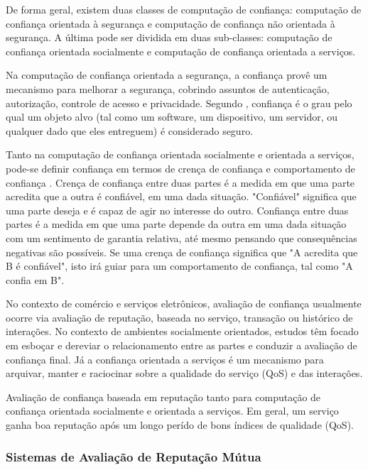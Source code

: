 De forma geral, existem duas classes de computação de confiança: computação de confiança orientada à segurança e computação de confiança não orientada à segurança. A última pode ser dividida em duas sub-classes: computação de confiança orientada socialmente e computação de confiança orientada a serviços.

Na computação de confiança orientada a segurança, a confiança provê um mecanismo para melhorar a segurança, cobrindo assuntos de autenticação, autorização, controle de acesso e privacidade. Segundo \cite{wang2008reputation}, confiança é o grau pelo qual um objeto alvo (tal como um software, um dispositivo, um servidor, ou qualquer dado que eles entreguem) é considerado seguro.

Tanto na computação de confiança orientada socialmente e orientada a serviços, pode-se definir confiança em termos de crença de confiança e comportamento de confiança \cite{wang2008reputation}. Crença de confiança entre duas partes é a medida em que uma parte acredita que a outra é confiável, em uma dada situação. "Confiável" significa que uma parte deseja e é capaz de agir no interesse do outro. Confiança entre duas partes é a medida em que uma parte depende da outra em uma dada situação com um sentimento de garantia relativa, até mesmo pensando que consequências negativas são possíveis. Se uma crença de confiança significa que "A acredita que B é confiável", isto irá guiar para um comportamento de confiança, tal como "A confia em B". \cite{wang2008reputation}

No contexto de comércio e serviços eletrônicos, avaliação de confiança usualmente ocorre via avaliação de reputação, baseada no serviço, transação ou histórico de interações. No contexto de ambientes socialmente orientados, estudos têm focado em esboçar e dereviar o relacionamento entre as partes e conduzir a avaliação  de confiança final. Já a confiança orientada a serviços é um mecanismo para arquivar, manter e raciocinar sobre a qualidade do serviço (QoS) e das interações. 

Avaliação de confiança baseada em reputação tanto para computação de confiança orientada socialmente e orientada a serviços.  Em geral, um serviço ganha boa reputação após um longo perído de bons índices de qualidade (QoS).

\subsubsection{Sistemas de Avaliação de Reputação Mútua}

